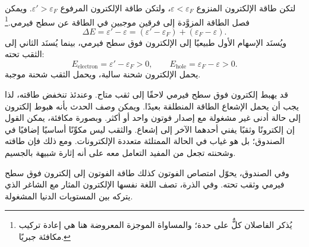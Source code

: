 لتكن طاقة الإلكترون المنزوع \(\varepsilon<\varepsilon_F\)، ولتكن طاقة الإلكترون المرفوع \(\varepsilon'>\varepsilon_F\). ويمكن فصل الطاقة المزوَّدة إلى فرقين موجبين في الطاقة عن سطح فيرمي.\footnote{يُذكر الفاصلان كلٌّ على حدة؛ والمساواة الموجزة المعروضة هنا هي إعادة تركيب مكافئة جبريًا.}
\begin{equation}
\Delta E
=\varepsilon'-\varepsilon
=(\varepsilon'-\varepsilon_F)+(\varepsilon_F-\varepsilon).
\end{equation}
ويُسنَد الإسهام الأول طبيعيًا إلى الإلكترون فوق سطح فيرمي، بينما يُسنَد الثاني إلى الثقب تحته:
\begin{equation}
E_{\mathrm{electron}}=\varepsilon'-\varepsilon_F>0,
\qquad
E_{\mathrm{hole}}=\varepsilon_F-\varepsilon>0.
\end{equation}
يحمل الإلكترون شحنة سالبة، ويحمل الثقب شحنة موجبة.

قد يهبط إلكترون فوق سطح فيرمي لاحقًا إلى ثقب متاح. وعندئذ تنخفض طاقته، لذا يجب أن يحمل الإشعاع الطاقة المنطلقة بعيدًا. ويمكن وصف الحدث بأنه هبوط إلكترون إلى حالة أدنى غير مشغولة مع إصدار فوتون واحد أو أكثر. وبصورة مكافئة، يمكن القول إن إلكترونًا وثقبًا يفني أحدهما الآخر إلى إشعاع. والثقب ليس مكوِّنًا أساسيًا إضافيًا في الصندوق؛ بل هو غياب في الحالة الممتلئة متعددة الإلكترونات. ومع ذلك فإن طاقته وشحنته تجعل من المفيد التعامل معه على أنه إثارة شبيهة بالجسيم.

\begin{classroomqa}
\end{classroomqa}

وفي الصندوق، يحوّل امتصاص الفوتون كذلك طاقة الفوتون إلى إلكترون فوق سطح فيرمي وثقب تحته. وفي الذرة، تصف اللغة نفسها الإلكترون المثار مع الشاغر الذي يتركه بين المستويات الدنيا المشغولة.

\begin{classroomqa}
\end{classroomqa}

